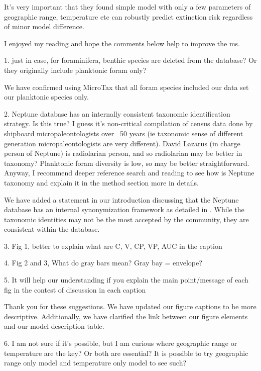 \documentclass[12pt,letterpaper]{article}
\begin{document}
\begin{refsection}
\begin{bfseries}
  It’s very important that they found simple model with only a few parameters of geographic range, temperature etc can robustly predict extinction risk regardless of minor model difference.

  I enjoyed my reading and hope the comments below help to improve the ms.

  1. just in case, for foraminifera, benthic species are deleted from the database? Or they originally include planktonic foram only?
\end{bfseries}

We have confirmed using MicroTax that all foram species included our data set our planktonic species only.

\begin{bfseries}
  2. Neptune database has an internally consistent taxonomic identification strategy. Is this true? I guess it’s non-critical compilation of census data done by shipboard micropaleontologists over ~50 years (ie taxonomic sense of different generation micropaleontologists are very different). David Lazarus (in charge person of Neptune) is radiolarian person, and so radiolarian may be better in taxonomy? Planktonic foram diversity is low, so may be better straightforward. Anyway, I recommend deeper reference search and reading to see how is Neptune taxonomy and explain it in the method section more in details.
\end{bfseries}

We have added a statement in our introduction discussing that the Neptune database has an internal synonymization framework as detailed in \citet{Lazarus1994}. While the taxonomic identities may not be the most accepted by the community, they are consistent within the database.

\begin{bfseries}
  3. Fig 1, better to explain what are C, V, CP, VP, AUC in the caption

  4. Fig 2 and 3, What do gray bars mean? Gray bay = envelope?

  5. It will help our understanding if you explain the main point/message of each fig in the contest of discussion in each caption 
\end{bfseries}

Thank you for these suggestions. We have updated our figure captions to be more descriptive. Additionally, we have clarified the link between our figure elements and our model description table.

\begin{bfseries}
  6. I am not sure if it’s possible, but I am curious where geographic range or temperature are the key? Or both are essential? It is possible to try geographic range only model and temperature only model to see such?
\end{bfseries}


\end{refsection}
\end{document}
